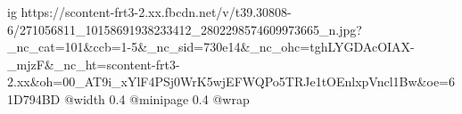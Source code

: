  
 
 
 
 

\ifcmt
  ig https://scontent-frt3-2.xx.fbcdn.net/v/t39.30808-6/271056811_10158691938233412_2802298574609973665_n.jpg?_nc_cat=101&ccb=1-5&_nc_sid=730e14&_nc_ohc=tghLYGDAcOIAX-_mjzF&_nc_ht=scontent-frt3-2.xx&oh=00_AT9i_xYlF4PSj0WrK5wjEFWQPo5TRJe1tOEnlxpVncl1Bw&oe=61D794BD
  @width 0.4
  @minipage 0.4
  @wrap \parpic[r]
\fi
